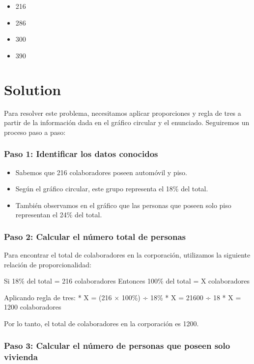 \documentclass[
]{article}
\providecommand{\tightlist}{%
  \setlength{\itemsep}{0pt}\setlength{\parskip}{0pt}}
\begin{document}
\begin{itemize}
\tightlist
\item
  216
\item
  286
\item
  300
\item
  390
\end{itemize}

\section{Solution}\label{solution}

Para resolver este problema, necesitamos aplicar proporciones y regla de
tres a partir de la información dada en el gráfico circular y el
enunciado. Seguiremos un proceso paso a paso:

\subsubsection{Paso 1: Identificar los datos
conocidos}\label{paso-1-identificar-los-datos-conocidos}

\begin{itemize}
\tightlist
\item
  Sabemos que 216 colaboradores poseen automóvil y piso.
\item
  Según el gráfico circular, este grupo representa el 18\% del total.
\item
  También observamos en el gráfico que las personas que poseen solo piso
  representan el 24\% del total.
\end{itemize}

\subsubsection{Paso 2: Calcular el número total de
personas}\label{paso-2-calcular-el-nuxfamero-total-de-personas}

Para encontrar el total de colaboradores en la corporación, utilizamos
la siguiente relación de proporcionalidad:

Si 18\% del total = 216 colaboradores Entonces 100\% del total = X
colaboradores

Aplicando regla de tres: * X = (216 × 100\%) ÷ 18\% * X = 21600 ÷ 18 * X
= 1200 colaboradores

Por lo tanto, el total de colaboradores en la corporación es 1200.

\subsubsection{Paso 3: Calcular el número de personas que poseen solo
vivienda}\label{paso-3-calcular-el-nuxfamero-de-personas-que-poseen-solo-vivienda}
\end{document}

